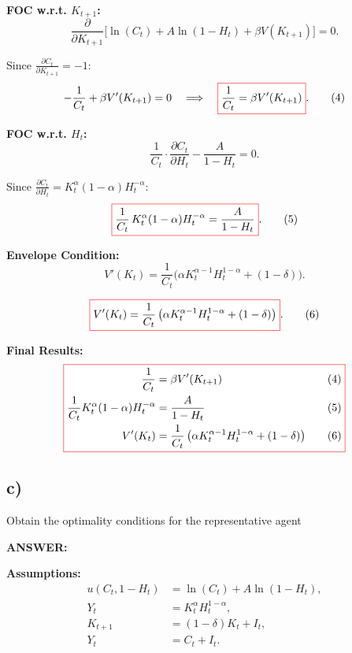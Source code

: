 \documentclass[12pt]{article}
\begin{document}
\noindent \textbf{FOC w.r.t. \(K_{t+1}\):}
\[
\frac{\partial}{\partial K_{t+1}}
\Big[ \ln(C_t) + A\ln(1-H_t) + \beta V(K_{t+1}) \Big] = 0.
\]

Since \(\tfrac{\partial C_t}{\partial K_{t+1}} = -1\):
\[
-\frac{1}{C_t} + \beta V'(K_{t+1}) = 0
\quad \Longrightarrow \quad
\fcolorbox{red}{white}{$ \displaystyle \frac{1}{C_t} = \beta V'(K_{t+1}) $}.
\tag{4}
\]

\noindent \textbf{FOC w.r.t. \(H_t\):}
\[
\frac{1}{C_t} \cdot \frac{\partial C_t}{\partial H_t} - \frac{A}{1-H_t} = 0.
\]

Since \(\tfrac{\partial C_t}{\partial H_t} = K_t^{\alpha}(1-\alpha)H_t^{-\alpha}\):
\[
\fcolorbox{red}{white}{$
\displaystyle \frac{1}{C_t} \, K_t^{\alpha}(1-\alpha)H_t^{-\alpha} = \frac{A}{1-H_t}
$}.
\tag{5}
\]

\noindent \textbf{Envelope Condition:}
\[
V'(K_t) = \frac{1}{C_t}\Big( \alpha K_t^{\alpha-1} H_t^{1-\alpha} + (1-\delta) \Big).
\]

\[
\fcolorbox{red}{white}{$
\displaystyle V'(K_t) = \frac{1}{C_t}\left( \alpha K_t^{\alpha-1} H_t^{1-\alpha} + (1-\delta) \right)
$}.
\tag{6}
\]

\noindent \textbf{Final Results:}
\[
\fcolorbox{red}{white}{$
\begin{aligned}
\frac{1}{C_t} &= \beta V'(K_{t+1}) \quad &(4) \\
\frac{1}{C_t} K_t^{\alpha}(1-\alpha)H_t^{-\alpha} &= \frac{A}{1-H_t} \quad &(5) \\
V'(K_t) &= \frac{1}{C_t}\left( \alpha K_t^{\alpha-1} H_t^{1-\alpha} + (1-\delta) \right) \quad &(6)
\end{aligned}
$}
\]

\subsection*{\noindent\textbf{c)}}

Obtain the optimality conditions for the representative agent

\vspace{0.5em}
\noindent\textcolor{formalred}{\textbf{ANSWER:}}

\noindent \textbf{Assumptions:}
\begin{align*}
u(C_t,1-H_t) &= \ln(C_t) + A\ln(1-H_t), \\
Y_t &= K_t^{\alpha} H_t^{1-\alpha}, \\
K_{t+1} &= (1-\delta)K_t + I_t, \\
Y_t &= C_t + I_t.
\end{align*}
\end{document}
